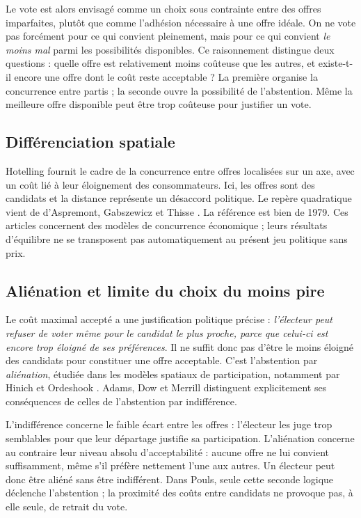 \documentclass[11pt,a4paper]{article}
\begin{document}
Le vote est alors envisagé comme un choix sous contrainte entre des
offres imparfaites, plutôt que comme l'adhésion nécessaire à une offre
idéale. On ne vote pas forcément pour ce qui convient pleinement,
mais pour ce qui convient \emph{le moins mal} parmi les possibilités
disponibles. Ce raisonnement distingue deux questions : quelle offre
est relativement moins coûteuse que les autres, et existe-t-il encore
une offre dont le coût reste acceptable ? La première organise la
concurrence entre partis ; la seconde ouvre la possibilité de
l'abstention. Même la meilleure offre disponible peut être trop
coûteuse pour justifier un vote.

\subsection{Différenciation spatiale}
Hotelling \cite{hotelling1929} fournit le cadre de la concurrence entre
offres localisées sur un axe, avec un coût lié à leur éloignement des
consommateurs. Ici, les offres sont des candidats et la distance représente
un désaccord politique. Le repère quadratique vient de
d'Aspremont, Gabszewicz et Thisse \cite{daspremont1979}.
La référence est bien de 1979. Ces articles concernent des modèles de
concurrence économique ; leurs résultats d'équilibre ne se transposent
pas automatiquement au présent jeu politique sans prix.

\subsection{Aliénation et limite du choix du moins pire}
Le coût maximal accepté a une justification politique précise :
\emph{l'électeur peut refuser de voter même pour le candidat le plus
proche, parce que celui-ci est encore trop éloigné de ses préférences}.
Il ne suffit donc pas d'être le moins éloigné des candidats pour
constituer une offre acceptable. C'est l'abstention par
\emph{aliénation}, étudiée dans les modèles spatiaux de participation,
notamment par Hinich et Ordeshook \cite{hinich1969}.
Adams, Dow et Merrill \cite{adams2006} distinguent explicitement
ses conséquences de celles de l'abstention par indifférence.

L'indifférence concerne le faible écart entre les offres : l'électeur
les juge trop semblables pour que leur départage justifie sa
participation. L'aliénation concerne au contraire leur niveau absolu
d'acceptabilité : aucune offre ne lui convient suffisamment, même
s'il préfère nettement l'une aux autres. Un électeur peut donc être
aliéné sans être indifférent. Dans Pouls, seule cette seconde logique
déclenche l'abstention ; la proximité des coûts entre candidats ne
provoque pas, à elle seule, de retrait du vote.
\end{document}

